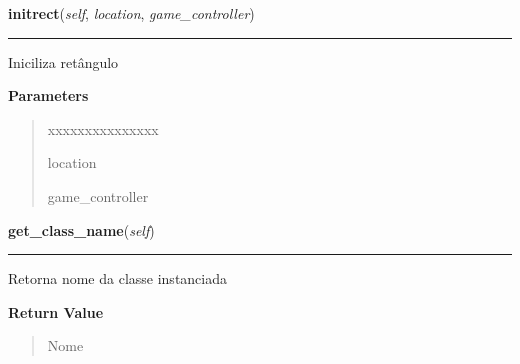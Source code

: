 \hspace{.8\funcindent}\begin{boxedminipage}{\funcwidth}

    \raggedright \textbf{initrect}(\textit{self}, \textit{location}, \textit{game\_controller})

    \vspace{-1.5ex}

    \rule{\textwidth}{0.5\fboxrule}
\setlength{\parskip}{2ex}
    Iniciliza retângulo

\setlength{\parskip}{1ex}
      \textbf{Parameters}
      \vspace{-1ex}

      \begin{quote}
        \begin{Ventry}{xxxxxxxxxxxxxxx}

          \item[location]

          \item[game\_controller]

        \end{Ventry}

      \end{quote}

    \end{boxedminipage}

    \label{pygame-asteroids:sprite_collision:SpriteCollision:get_class_name}

    \vspace{0.5ex}

\hspace{.8\funcindent}\begin{boxedminipage}{\funcwidth}

    \raggedright \textbf{get\_class\_name}(\textit{self})

    \vspace{-1.5ex}

    \rule{\textwidth}{0.5\fboxrule}
\setlength{\parskip}{2ex}
    Retorna nome da classe instanciada

\setlength{\parskip}{1ex}
      \textbf{Return Value}
    \vspace{-1ex}

      \begin{quote}
      Nome

      \end{quote}

    \end{boxedminipage}

